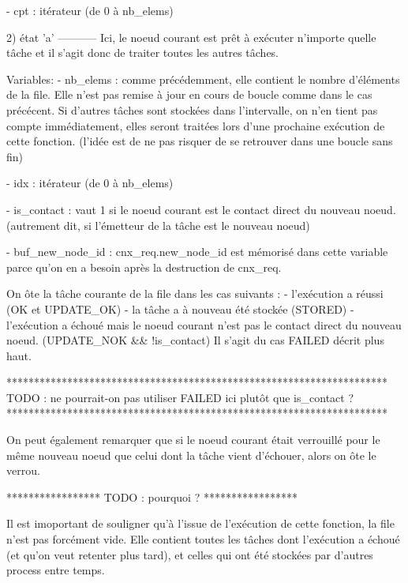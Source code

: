     - cpt      : itérateur (de 0 à nb_elems)

2) état 'a'
-----------
Ici, le noeud courant est prêt à exécuter n'importe quelle tâche et il s'agit donc de traiter toutes
les autres tâches.

Variables:
    - nb_elems   :      comme précédemment, elle contient le nombre d'éléments de la file.
                        Elle n'est pas remise à jour en cours de boucle comme dans le cas précécent.
                        Si d'autres tâches sont stockées dans l'intervalle, on n'en tient pas compte
                        immédiatement, elles seront traitées lors d'une prochaine exécution de cette
                        fonction. (l'idée est de ne pas risquer de se retrouver dans une boucle sans
                        fin)

    - idx        :      itérateur (de 0 à nb_elems)

    - is_contact :      vaut 1 si le noeud courant est le contact direct du nouveau noeud.
                        (autrement dit, si l'émetteur de la tâche est le nouveau noeud)

    - buf_new_node_id : cnx_req.new_node_id est mémorisé dans cette variable parce qu'on en a besoin
                        après la destruction de cnx_req.

    On ôte la tâche courante de la file dans les cas suivants :
        - l'exécution a réussi (OK et UPDATE_OK)
        - la tâche a à nouveau été stockée (STORED)
        - l'exécution a échoué mais le noeud courant n'est pas le contact direct du nouveau noeud.
          (UPDATE_NOK && !is_contact)
          Il s'agit du cas FAILED décrit plus haut.

*********************************************************************
TODO : ne pourrait-on pas utiliser FAILED ici plutôt que is_contact ?
*********************************************************************

On peut également remarquer que si le noeud courant était verrouillé pour le même nouveau noeud que
celui dont la tâche vient d'échouer, alors on ôte le verrou.

*****************
TODO : pourquoi ?
*****************

Il est imoportant de souligner qu'à l'issue de l'exécution de cette fonction, la file n'est pas
forcément vide. Elle contient toutes les tâches dont l'exécution a échoué (et qu'on veut retenter
plus tard), et celles qui ont été stockées par d'autres process entre temps.


